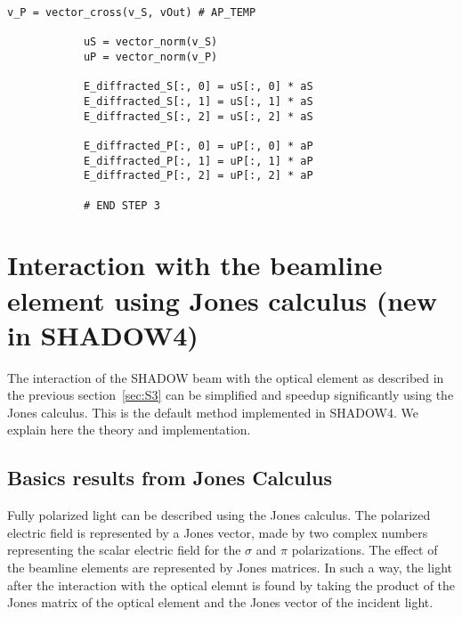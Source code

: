 \documentclass{iucr}
\begin{document}
\begin{lstlisting}[caption={Code to guarantee that the local $\sigma$ and $\pi$ electric fields hold the orthogonality relationships.}, label={lst:finalorthogonality}, captionpos=b]
            v_P = vector_cross(v_S, vOut) # AP_TEMP

            uS = vector_norm(v_S)
            uP = vector_norm(v_P)

            E_diffracted_S[:, 0] = uS[:, 0] * aS
            E_diffracted_S[:, 1] = uS[:, 1] * aS
            E_diffracted_S[:, 2] = uS[:, 2] * aS

            E_diffracted_P[:, 0] = uP[:, 0] * aP
            E_diffracted_P[:, 1] = uP[:, 1] * aP
            E_diffracted_P[:, 2] = uP[:, 2] * aP

            # END STEP 3
\end{lstlisting}


\section{Interaction with the beamline element using Jones calculus (new in SHADOW4)}
\label{sec:S4}

The interaction of the SHADOW beam with the optical element as described in the previous section~\ref{sec:S3} can be simplified and speedup significantly using the Jones calculus. This is the default method implemented in SHADOW4. We explain here the theory and implementation. 



\subsection{Basics results from Jones Calculus}
\label{sec:Jones}

Fully polarized light can be described using the Jones calculus. The polarized electric field is represented by a Jones vector, made by two complex numbers representing the scalar electric field for the $\sigma$ and $\pi$ polarizations. 
The effect of the beamline elements are represented by Jones matrices.
In such a way, the light after the interaction with the optical elemnt is found by taking the product of the Jones matrix of the optical element and the Jones vector of the incident light. 
\end{document}
